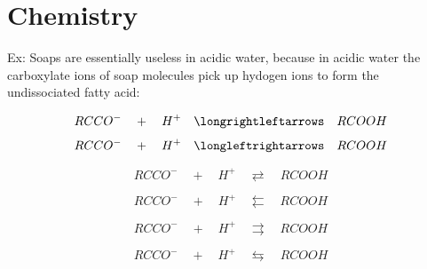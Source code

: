 ﻿\documentclass{article}
\begin{document}
\section{Chemistry}

Ex:
Soaps are essentially useless in acidic water, because in acidic water the carboxylate
ions of soap molecules pick up hydogen ions to form the undissociated fatty acid:


$$RCCO^- \quad + \quad H^+ \quad\longrightleftarrows\quad RCOOH$$
$$RCCO^- \quad + \quad H^+ \quad\longleftrightarrows\quad RCOOH$$

$$RCCO^- \quad + \quad H^+ \quad\rightleftarrows\quad RCOOH$$

$$RCCO^- \quad + \quad H^+ \quad\leftleftarrows\quad RCOOH$$

$$RCCO^- \quad + \quad H^+ \quad\rightrightarrows\quad RCOOH$$

$$RCCO^- \quad + \quad H^+ \quad\leftrightarrows\quad RCOOH$$
\end{document}
